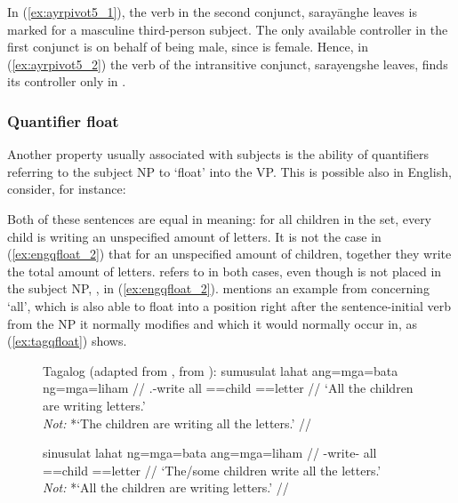 In (\ref{ex:ayrpivot5_1}), the verb in the second conjunct, 
{sarayāng}{he leaves} is marked for a masculine third-person subject. The only
available controller in the first con\-junct is  on behalf of
being male, since  is female. Hence, in
(\ref{ex:ayrpivot5_2}) the verb of the intransitive conjunct, 
{sarayeng}{she leaves}, finds its controller only in .

\subsubsection{Quantifier float}
\label{subsubsec:quantfloat}

Another property usually associated with subjects is the ability of quantifiers
referring to the subject NP to `float' into the VP. This is possible also in
English, consider, for instance:

\pex\label{ex:engqfloat}%
\a\label{ex:engqfloat_1}%
\a\label{ex:engqfloat_2}%
\xe

Both of these sentences are equal in meaning: for all children in the set,
every child is writing an unspecified amount of letters. It is not the case in
(\ref{ex:engqfloat_2}) that for an unspecified amount of children, together
they write the total amount of letters.  refers to  in
both cases, even though  is not placed in the subject NP, , in (\ref{ex:engqfloat_2}). \citet{kroeger1991} mentions an example
from \citet{schachterotanes1972} concerning  `all', which is also
able to float into a position right after the sentence-initial verb from the NP
it normally modifies and which it would normally occur in, as
(\ref{ex:tagqfloat}) shows.

\begin{figure}[t]
\pex\label{ex:tagqfloat}%
Tagalog (adapted from \cite[22]{kroeger1991}, from 
	\cite[501]{schachterotanes1972}):
\a\label{ex:tagqfloat_1}\begingl
	\gla sumusulat lahat ang=mga=bata ng=mga=liham //
	\glb \Av{}.\Impf{}-write all \Nom{}=\Pl{}=child \Gen{}=\Pl{}=letter //
	\glft `All the children are writing letters.'\\
		\textit{Not:} *`The children are writing all the letters.' //
\endgl

\a\label{ex:tagqfloat_2}\begingl
	\gla sinusulat lahat ng=mga=bata ang=mga=liham //
	\glb \Impf{}-write-\Ov{} all \Gen{}=\Pl{}=child \Nom{}=\Pl{}=letter //
	\glft `The/some children write all the letters.'\\
		\textit{Not:} *`All the children are writing letters.' //
\endgl

\xe
\end{figure}

